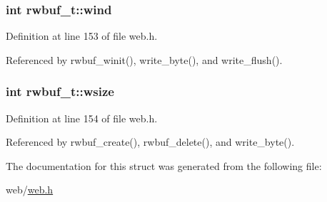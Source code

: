 \subsubsection[{\texorpdfstring{wind}{wind}}]{\setlength{\rightskip}{0pt plus 5cm}int rwbuf\+\_\+t\+::wind}\hypertarget{structrwbuf__t_a135345eee44e93f37e57dbabec12c339}{}\label{structrwbuf__t_a135345eee44e93f37e57dbabec12c339}


Definition at line 153 of file web.\+h.



Referenced by rwbuf\+\_\+winit(), write\+\_\+byte(), and write\+\_\+flush().

\subsubsection[{\texorpdfstring{wsize}{wsize}}]{\setlength{\rightskip}{0pt plus 5cm}int rwbuf\+\_\+t\+::wsize}\hypertarget{structrwbuf__t_ac723cf150dd35d0f67ba7d38b18863ad}{}\label{structrwbuf__t_ac723cf150dd35d0f67ba7d38b18863ad}


Definition at line 154 of file web.\+h.



Referenced by rwbuf\+\_\+create(), rwbuf\+\_\+delete(), and write\+\_\+byte().



The documentation for this struct was generated from the following file\+:\begin{DoxyCompactItemize}
\item 
web/\hyperlink{web_8h}{web.\+h}\end{DoxyCompactItemize}

